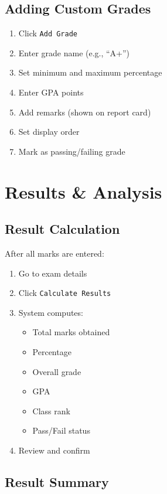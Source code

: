\documentclass[12pt,a4paper]{report}
\begin{document}
\section{Adding Custom Grades}

\begin{enumerate}[leftmargin=*]
    \item Click \texttt{Add Grade}
    \item Enter grade name (e.g., ``A+'')
    \item Set minimum and maximum percentage
    \item Enter GPA points
    \item Add remarks (shown on report card)
    \item Set display order
    \item Mark as passing/failing grade
\end{enumerate}

\chapter{Results \& Analysis}

\section{Result Calculation}

After all marks are entered:
\begin{enumerate}[leftmargin=*]
    \item Go to exam details
    \item Click \texttt{Calculate Results}
    \item System computes:
    \begin{itemize}
        \item Total marks obtained
        \item Percentage
        \item Overall grade
        \item GPA
        \item Class rank
        \item Pass/Fail status
    \end{itemize}
    \item Review and confirm
\end{enumerate}

\section{Result Summary}
\end{document}
